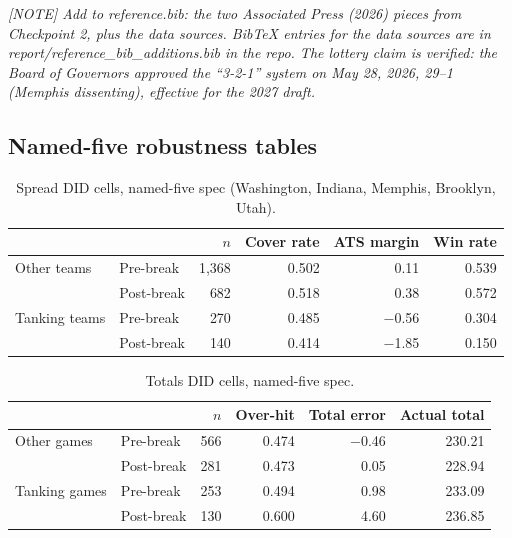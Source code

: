 \documentclass[12pt,letterpaper]{article}
\newcommand{\authnote}[1]{{\color{gray}\textit{[NOTE] #1}}}
\begin{document}
\authnote{Add to reference.bib: the two Associated Press (2026) pieces from
Checkpoint 2, plus the data sources. BibTeX entries for the data sources
are in report/reference\_bib\_additions.bib in the repo. The lottery claim
is verified: the Board of Governors approved the ``3-2-1'' system on May 28,
2026, 29--1 (Memphis dissenting), effective for the 2027 draft.}




\clearpage
\makeappendix

\subsection{Named-five robustness tables}

\begin{table}[htbp]
\centering
\caption{Spread DID cells, named-five spec (Washington, Indiana, Memphis,
Brooklyn, Utah).}
\label{tab:spread-named}
\begin{tabular}{llrrrr}
\hline
& & $n$ & Cover rate & ATS margin & Win rate \\
\hline
Other teams & Pre-break & 1,368 & 0.502 & 0.11 & 0.539 \\
& Post-break & 682 & 0.518 & 0.38 & 0.572 \\
Tanking teams & Pre-break & 270 & 0.485 & $-$0.56 & 0.304 \\
& Post-break & 140 & 0.414 & $-$1.85 & 0.150 \\
\hline
\end{tabular}
\end{table}

\begin{table}[htbp]
\centering
\caption{Totals DID cells, named-five spec.}
\label{tab:totals-named}
\begin{tabular}{llrrrr}
\hline
& & $n$ & Over-hit & Total error & Actual total \\
\hline
Other games & Pre-break & 566 & 0.474 & $-$0.46 & 230.21 \\
& Post-break & 281 & 0.473 & 0.05 & 228.94 \\
Tanking games & Pre-break & 253 & 0.494 & 0.98 & 233.09 \\
& Post-break & 130 & 0.600 & 4.60 & 236.85 \\
\hline
\end{tabular}
\end{table}
\end{document}
